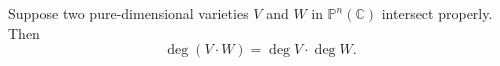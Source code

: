Suppose two pure-dimensional varieties $V$ and $W$ in $\mathbb{P}^n(\mathbb{C})$ intersect properly. Then
\[
\deg(V \cdot W) = \deg V \cdot \deg W.
\]

